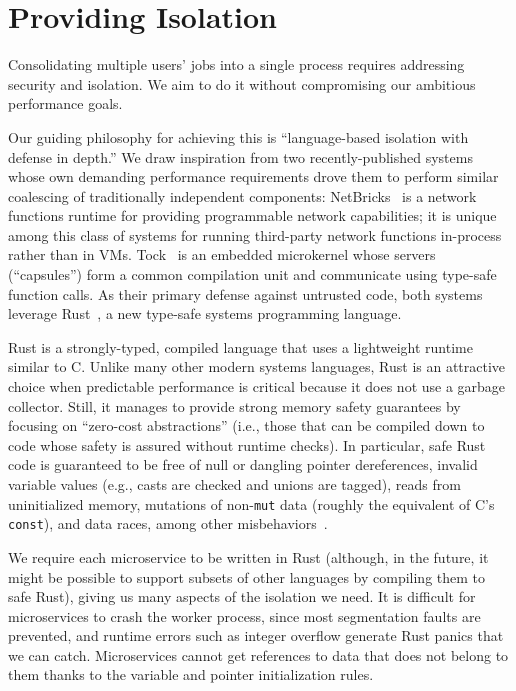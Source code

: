 \section{Providing Isolation}
\label{sec:isolation}

Consolidating multiple users' jobs into a single process requires
addressing security and isolation. We aim to do it without
compromising our ambitious performance goals.

Our guiding philosophy for achieving this is ``language-based isolation with defense
in depth.'' We draw inspiration from two recently-published systems whose own
demanding performance requirements drove them to perform similar coalescing of
traditionally independent components:  NetBricks~\cite{Panda2016} is a network
functions runtime for providing programmable network capabilities; it is unique among
this class of systems for running third-party network functions in-process rather
than in VMs.  Tock~\cite{Levy2017} is an embedded microkernel whose servers
(``capsules'') form a common compilation unit and communicate using type-safe
function calls.  As their primary defense against untrusted code, both systems
leverage Rust~\cite{www-rustlang}, a new type-safe systems programming language.


Rust is a strongly-typed, compiled language that uses a lightweight runtime
similar to C.  Unlike many other modern systems languages, Rust is an
attractive choice when predictable performance is critical because it does not use
a garbage collector.  Still, it manages to provide strong memory safety
guarantees by focusing on ``zero-cost abstractions'' (i.e., those that can be
compiled down to code whose safety is assured without runtime checks).  In
particular, safe Rust code is guaranteed to be free of null or dangling pointer
dereferences, invalid variable values (e.g., casts are checked and unions are
tagged), reads from uninitialized memory, mutations of non-\texttt{mut} data (roughly
the equivalent of C's \texttt{const}), and data races, among other
misbehaviors~\cite{www-rustlang-ub}.

We require each microservice to be written in Rust (although, in the future, it
might be possible to support subsets of other languages by compiling them to safe
Rust), giving us many aspects of the isolation we need.  It is difficult for
microservices to crash the worker process, since most segmentation faults are
prevented, and runtime errors such as integer overflow generate Rust panics that we
can catch.  Microservices cannot get references to data that does not belong to them
thanks to the variable and pointer initialization rules.

